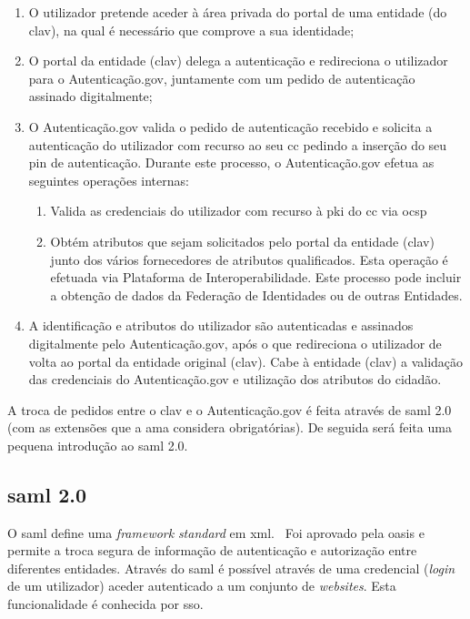 \begin{enumerate}
    \item O utilizador pretende aceder à área privada do portal de uma entidade (do \acrshort{clav}), na qual é necessário que comprove a sua identidade;
    \item O portal da entidade (\acrshort{clav}) delega a autenticação e redireciona o utilizador para o Autenticação.gov, juntamente com um pedido de autenticação assinado digitalmente;
    \item O Autenticação.gov valida o pedido de autenticação recebido e solicita a autenticação do utilizador com recurso ao seu \acrshort{cc} pedindo a inserção do seu \acrshort{pin} de autenticação. Durante este processo, o Autenticação.gov efetua as seguintes operações internas:
    \begin{enumerate}
        \item Valida as credenciais do utilizador com recurso à \acrshort{pki} do \acrshort{cc} via \acrshort{ocsp}
        \item Obtém atributos que sejam solicitados pelo portal da entidade (\acrshort{clav}) junto dos vários fornecedores de atributos qualificados. Esta operação é efetuada via Plataforma de Interoperabilidade. Este processo pode incluir a obtenção de dados da Federação de Identidades ou de outras Entidades.
    \end{enumerate}
    \item A identificação e atributos do utilizador são autenticadas e assinados digitalmente pelo Autenticação.gov, após o que redireciona o utilizador de volta ao portal da entidade original (\acrshort{clav}). Cabe à entidade (\acrshort{clav}) a validação das credenciais do Autenticação.gov e utilização dos atributos do cidadão.
\end{enumerate}

A troca de pedidos entre o \acrshort{clav} e o Autenticação.gov é feita através de \acrshort{saml} 2.0 (com as extensões que a \acrshort{ama} considera obrigatórias). De seguida será feita uma pequena introdução ao \acrshort{saml} 2.0. 

\subsection{\acrshort{saml} 2.0}
O \acrfull{saml} define uma \textit{framework} \textit{standard} em \acrshort{xml}.~\cite{sam2man} Foi aprovado pela \acrshort{oasis} e permite a troca segura de informação de autenticação e autorização entre diferentes entidades. Através do \acrshort{saml} é possível através de uma credencial (\textit{login} de um utilizador) aceder autenticado a um conjunto de \textit{websites}. Esta funcionalidade é conhecida por \acrfull{sso}.

